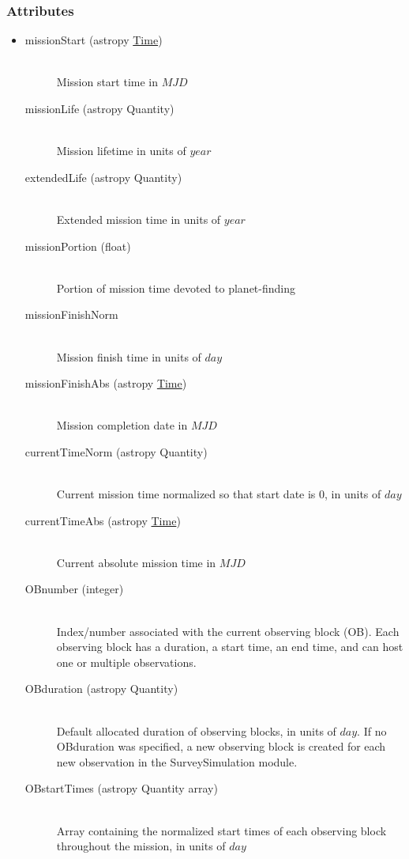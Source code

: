 \documentclass[cleanfoot]{asme2ej}
\begin{document}
\subsubsection*{Attributes}
\begin{itemize}
\item
\begin{description}
    \item[missionStart (astropy \href{http://astropy.readthedocs.org/en/latest/time/index.html}{Time})] \hfill \\
        Mission start time in $ MJD $
    \item[missionLife (astropy Quantity)] \hfill \\ Mission lifetime in units of $ year $
    \item[extendedLife (astropy Quantity)] \hfill \\ Extended mission time in units of $ year $
    \item[missionPortion (float)] \hfill \\ Portion of mission time devoted to planet-finding
    \item[missionFinishNorm] \hfill \\ Mission finish time in units of $ day $
    \item[missionFinishAbs (astropy \href{http://astropy.readthedocs.org/en/latest/time/index.html}{Time})] \hfill \\ Mission completion date in $ MJD $
    \item[currentTimeNorm (astropy Quantity)] \hfill \\ Current mission time normalized so that start date is 0, in units of $ day $
    \item[currentTimeAbs (astropy \href{http://astropy.readthedocs.org/en/latest/time/index.html}{Time})] \hfill \\ Current absolute mission time in $ MJD $
    \item[OBnumber (integer)] \hfill \\ Index/number associated with the current observing block (OB). Each observing block has a duration, a start time, an end time, and can host one or multiple observations.
    \item[OBduration (astropy Quantity)] \hfill \\ Default allocated duration of observing blocks, in units of $day$. If no OBduration was specified, a new observing block is created for each new observation in the SurveySimulation module. 
    \item[OBstartTimes (astropy Quantity array)] \hfill \\ Array containing the normalized start times of each observing block throughout the mission, in units of $day$

\end{description}
\end{itemize}
\end{document}
